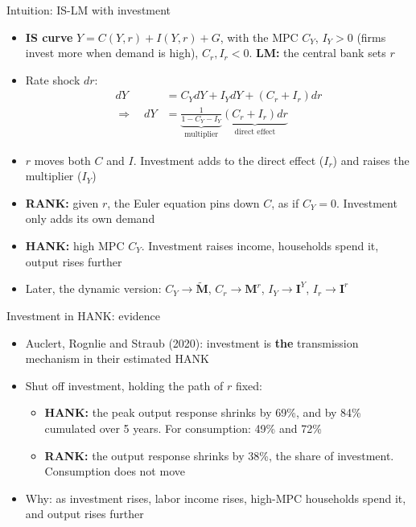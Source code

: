 \documentclass[10pt,english]{beamer}
\begin{document}
\begin{frame}{Intuition: IS-LM with investment}
\begin{itemize}
\item <+->\textbf{IS curve} $Y=C(Y,r)+I(Y,r)+G$, with the MPC $C_{Y}$, $I_{Y}>0$ (firms invest more when demand is high), $C_{r},I_{r}<0$. \textbf{LM:} the central bank sets $r$
\item <+->Rate shock $dr$:
\begin{align*}
dY & =C_{Y}dY+I_{Y}dY+(C_{r}+I_{r})dr\\
\Rightarrow\quad dY & =\underbrace{\frac{1}{1-C_{Y}-I_{Y}}}_{\text{multiplier}}\underbrace{(C_{r}+I_{r})dr}_{\text{direct effect}}
\end{align*}
\item <+->$r$ moves both $C$ and $I$. Investment adds to the direct effect ($I_{r}$) and raises the multiplier ($I_{Y}$)
\item <+->\textbf{RANK:} given $r$, the Euler equation pins down $C$, as if $C_{Y}=0$. Investment only adds its own demand
\item <+->\textbf{HANK:} high MPC $C_{Y}$. Investment raises income, households spend it, output rises further
\item <+->Later, the dynamic version: $C_{Y}\to\tilde{\boldsymbol{M}}$, $C_{r}\to\boldsymbol{M}^{r}$, $I_{Y}\to\boldsymbol{I}^{Y}$, $I_{r}\to\boldsymbol{I}^{r}$
\end{itemize}
\end{frame}
%
\begin{frame}{Investment in HANK: evidence}
\begin{itemize}
\item <+->Auclert, Rognlie and Straub (2020): investment is \textbf{the} transmission mechanism in their estimated HANK
\item <+->Shut off investment, holding the path of $r$ fixed:
\begin{itemize}
\item \textbf{HANK:} the peak output response shrinks by 69\%, and by 84\% cumulated over 5 years. For consumption: 49\% and 72\%
\item \textbf{RANK:} the output response shrinks by 38\%, the share of investment. Consumption does not move
\end{itemize}
\item <+->Why: as investment rises, labor income rises, high-MPC households spend it, and output rises further
\end{itemize}
\end{frame}
\end{document}
